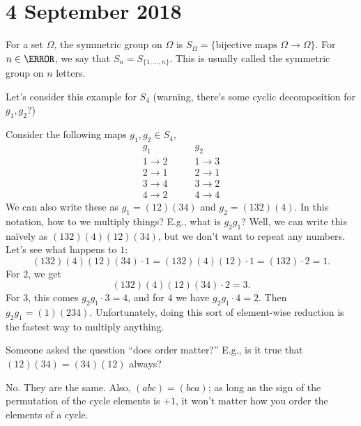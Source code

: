 \section{4 September 2018}

\begin{definition}
For a set $\Omega$, the symmetric group on $\Omega$ is $S_\Omega = \{\text{bijective maps $\Omega \to \Omega$}\}$. For $n \in \N$, we say that $S_n = S_{\{1,\dotsc,n\}}$. This is usually called the symmetric group on $n$ letters.
\end{definition}

Let's consider this example for $S_4$ (warning, there's some cyclic decomposition for $g_1, g_2$?)

\begin{example}
Consider the following maps $g_1, g_2 \in S_4$,
\[
	\begin{array}{c}
	g_1 \\
	1 \to 2 \\
	2 \to 1 \\
	3 \to 4 \\
	4 \to 2
	\end{array} \qquad
	\begin{array}{c}
	g_2 \\
	1 \to 3 \\
	2 \to 1 \\
	3 \to 2 \\
	4 \to 4
	\end{array}
\]
We can also write these as $g_1 = (12)(34)$ and $g_2 = (132)(4)$. In this notation, how to we multiply things? E.g., what is $g_2g_1$? Well, we can write this naïvely as $(132)(4)(12)(34)$, but we don't want to repeat any numbers. Let's see what happens to $1$:
\[ (132)(4)(12)(34) \cdot 1 = (132)(4)(12) \cdot 1 = (132) \cdot 2 = 1. \] For $2$, we get 
\[ (132)(4)(12)(34) \cdot 2 = 3. \] For $3$, this comes $g_2g_1 \cdot 3 = 4$, and for $4$ we have $g_2g_1 \cdot 4 = 2$. Then $g_2g_1 = (1)(234)$. Unfortunately, doing this sort of element-wise reduction is the fastest way to multiply anything.
\end{example}

\begin{problem}
Someone asked the question ``does order matter?'' E.g., is it true that $(12)(34) = (34)(12)$ always?
\end{problem}
\begin{solution}
No. They are the same. Also, $(abc) = (bca)$; as long as the sign of the permutation of the cycle elements is $+1$, it won't matter how you order the elements of a cycle.
\end{solution}


